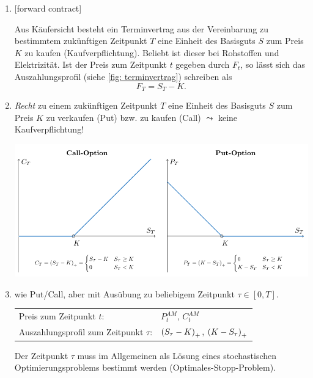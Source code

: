 \begin{enumerate}[leftmargin=*, label=(\alph*)]
	\item {} [forward contract]
	
	Aus Käufersicht besteht ein Terminvertrag aus der Vereinbarung zu bestimmtem zukünftigen Zeitpunkt $T$ eine Einheit des Basisguts $S$ zum Preis $K$ zu kaufen (Kaufverpflichtung). Beliebt ist dieser bei Rohstoffen und Elektrizität. Ist der Preis zum Zeitpunkt $t$ gegeben durch $F_t$, so lässt sich das Auszahlungsprofil (siehe \cref{fig: terminvertrag}) schreiben als 
	\begin{equation*}
		F_T = S_T - K .
	\end{equation*}
	
	
	\item {}
	
	\textit{Recht} zu einem zukünftigen Zeitpunkt $T$ eine Einheit des Basisguts $S$ zum Preis $K$ zu verkaufen (Put) bzw. zu kaufen (Call)
	$\leadsto$ keine Kaufverpflichtung!
	
	\begin{center}
		\includegraphics[width=\linewidth]{./img/call-put-auszahlungsprofil}
	\end{center}


	\item {}
	
	wie Put/Call, aber mit Ausübung zu beliebigem Zeitpunkt $\tau \in [0,T]$.
	
	\begin{tabular}{ll}
		Preis zum Zeitpunkt $t$: & $P_t^{AM}$, $C_t^{AM}$ \\
		Auszahlungsprofil zum Zeitpunkt $\tau$: & $\left( S_\tau - K \right)_+$, $\left( K - S_\tau \right)_+$
	\end{tabular}
	
	Der Zeitpunkt $\tau$ muss im Allgemeinen als Lösung eines stochastischen Optimierungsproblems bestimmt werden (Optimales-Stopp-Problem).
\end{enumerate}